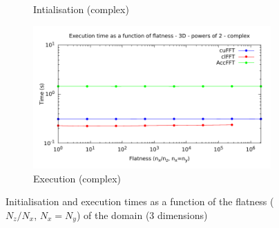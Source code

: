 \documentclass[12pt, a4paper]{article}
\begin{document}
\begin{figure}[H]
\begin{subfigure}{.5\textwidth}
\caption{Intialisation (complex)}
\label{FLAT1DCI}
\end{subfigure}%
\begin{subfigure}{.5\textwidth}
\centering
\includegraphics[width=.9\linewidth]{graphs/flatness-c-exec.pdf}
\caption{Execution (complex)}
\label{FLAT1DCE}
\end{subfigure}
\caption{Initialisation and execution times as a function of the flatness ($N_z/N_x$, $N_x=N_y$) of the domain (3 dimensions)}
\label{FLATNESSGRAPH}
\end{figure}
\end{document}
